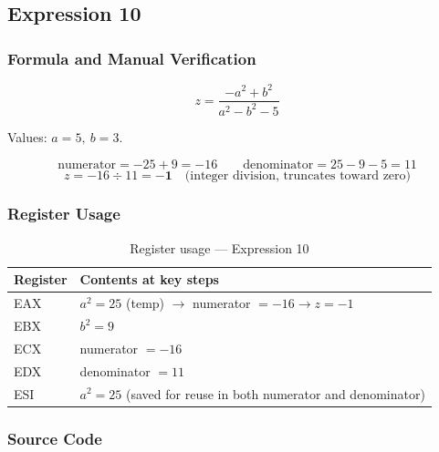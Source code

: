 \documentclass[12pt,a4paper]{article}
\begin{document}
\newpage
\subsection{Expression 10}

\subsubsection{Formula and Manual Verification}

\[
z = \frac{-a^{2} + b^{2}}{a^{2} - b^{2} - 5}
\]

Values: $a=5,\ b=3$.

\[
\text{numerator}   = -25 + 9 = -16
\qquad
\text{denominator} = 25 - 9 - 5 = 11
\]
\[
z = -16 \div 11 = \mathbf{-1} \quad\text{(integer division, truncates toward zero)}
\]

\subsubsection{Register Usage}

\begin{table}[H]
\centering
\caption{Register usage --- Expression 10}
\small
\begin{tabular}{|l|p{9cm}|}
\hline
\textbf{Register} & \textbf{Contents at key steps} \\
\hline
EAX & $a^2=25$ (temp) $\to$ numerator $=-16 \to z=-1$ \\
\hline
EBX & $b^2 = 9$ \\
\hline
ECX & numerator $= -16$ \\
\hline
EDX & denominator $= 11$ \\
\hline
ESI & $a^2 = 25$ (saved for reuse in both numerator and denominator) \\
\hline
\end{tabular}
\end{table}

\subsubsection{Source Code}
\end{document}
